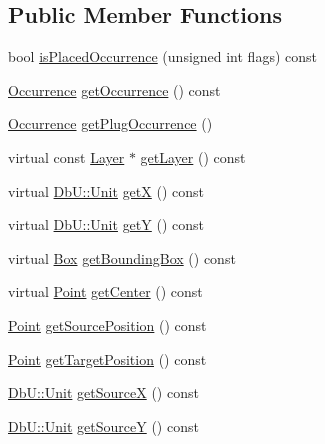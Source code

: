 \subsection*{Public Member Functions}
\begin{DoxyCompactItemize}
\item 
bool \hyperlink{classHurricane_1_1RoutingPad_a3e94730dded06e5953087755f0551b73}{is\+Placed\+Occurrence} (unsigned int flags) const
\item 
\hyperlink{classHurricane_1_1Occurrence}{Occurrence} \hyperlink{classHurricane_1_1RoutingPad_a2767550364ef01c772f3270850ec052f}{get\+Occurrence} () const
\item 
\hyperlink{classHurricane_1_1Occurrence}{Occurrence} \hyperlink{classHurricane_1_1RoutingPad_a30190c50577ce47727dec11f5423a85b}{get\+Plug\+Occurrence} ()
\item 
virtual const \hyperlink{classHurricane_1_1Layer}{Layer} $\ast$ \hyperlink{classHurricane_1_1RoutingPad_a7f1e300e4148556fa223e623738d79d4}{get\+Layer} () const
\item 
virtual \hyperlink{group__DbUGroup_ga4fbfa3e8c89347af76c9628ea06c4146}{Db\+U\+::\+Unit} \hyperlink{classHurricane_1_1RoutingPad_a5c9c00c648bd0d24e1a8b0876ab442df}{getX} () const
\item 
virtual \hyperlink{group__DbUGroup_ga4fbfa3e8c89347af76c9628ea06c4146}{Db\+U\+::\+Unit} \hyperlink{classHurricane_1_1RoutingPad_aede4c04a7f893b1e5478b164b6eaae2d}{getY} () const
\item 
virtual \hyperlink{classHurricane_1_1Box}{Box} \hyperlink{classHurricane_1_1RoutingPad_a2cc2894b5e1c82b725dedcf1978dc773}{get\+Bounding\+Box} () const
\item 
virtual \hyperlink{classHurricane_1_1Point}{Point} \hyperlink{classHurricane_1_1RoutingPad_ad254b92749146a0eaaa7ed8f33fac4da}{get\+Center} () const
\item 
\hyperlink{classHurricane_1_1Point}{Point} \hyperlink{classHurricane_1_1RoutingPad_acc706fecb615230387a73ed8a7384c8e}{get\+Source\+Position} () const
\item 
\hyperlink{classHurricane_1_1Point}{Point} \hyperlink{classHurricane_1_1RoutingPad_a8de215adabb4a3330d02339c38dd6d4b}{get\+Target\+Position} () const
\item 
\hyperlink{group__DbUGroup_ga4fbfa3e8c89347af76c9628ea06c4146}{Db\+U\+::\+Unit} \hyperlink{classHurricane_1_1RoutingPad_ae80e8f84f5806582905f6695f5cc43df}{get\+SourceX} () const
\item 
\hyperlink{group__DbUGroup_ga4fbfa3e8c89347af76c9628ea06c4146}{Db\+U\+::\+Unit} \hyperlink{classHurricane_1_1RoutingPad_a75983ff3507f4cbf2aaa4e3132eac987}{get\+SourceY} () const

\end{DoxyCompactItemize}
